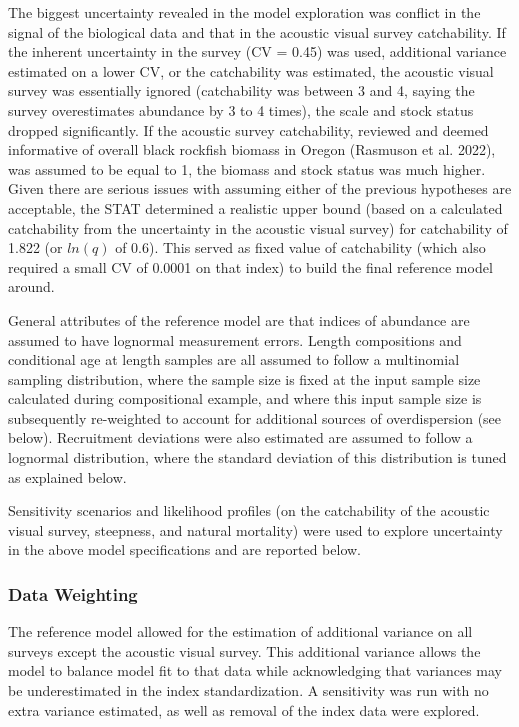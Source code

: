 \documentclass[11pt,
  english,
  letterpaper,
]{article}
\begin{document}
The biggest uncertainty revealed in the model exploration was conflict in the signal of the biological data and that in the acoustic visual survey catchability. If the inherent uncertainty in the survey (CV = 0.45) was used, additional variance estimated on a lower CV, or the catchability was estimated, the acoustic visual survey was essentially ignored (catchability was between 3 and 4, saying the survey overestimates abundance by 3 to 4 times), the scale and stock status dropped significantly. If the acoustic survey catchability, reviewed and deemed informative of overall black rockfish biomass in Oregon (Rasmuson et al. 2022), was assumed to be equal to 1, the biomass and stock status was much higher. Given there are serious issues with assuming either of the previous hypotheses are acceptable, the STAT determined a realistic upper bound (based on a calculated catchability from the uncertainty in the acoustic visual survey) for catchability of 1.822 (or \(ln(q)\) of 0.6). This served as fixed value of catchability (which also required a small CV of 0.0001 on that index) to build the final reference model around.

General attributes of the reference model are that indices of abundance are assumed to have lognormal measurement errors. Length compositions and conditional age at length samples are all assumed to follow a multinomial sampling distribution, where the sample size is fixed at the input sample size calculated during compositional example, and where this input sample size is subsequently re-weighted to account for additional sources of overdispersion (see below). Recruitment deviations were also estimated are assumed to follow a lognormal distribution, where the standard deviation of this distribution is tuned as explained below.

Sensitivity scenarios and likelihood profiles (on the catchability of the acoustic visual survey, steepness, and natural mortality) were used to explore uncertainty in the above model specifications and are reported below.

\hypertarget{data-weighting}{%
\subsubsection{Data Weighting}\label{data-weighting}}

The reference model allowed for the estimation of additional variance on all surveys except the acoustic visual survey. This additional variance allows the model to balance model fit to that data while acknowledging that variances may be underestimated in the index standardization. A sensitivity was run with no extra variance estimated, as well as removal of the index data were explored.
\end{document}
